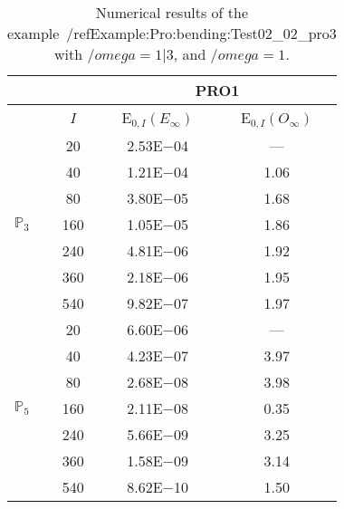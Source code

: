 \begin{table}[H]
\caption{Numerical results of the example~/ref{Example:Pro:bending:Test02_02_pro3} with $/omega=1|3$, and $/omega=1$.}
\setlength{\tabcolsep}{5pt}
\centering
\begin{tabular}{@{}l c c c@{}}
\toprule
 &  & \multicolumn{2}{c}{PRO1}\\
\midrule
 & $I$ & E$_{0,I}(E_{\infty})$ & E$_{0,I}(O_{\infty})$\\
\midrule
\multirow{7}{*}{$\mathbb{P}_{3}$}
 & 20 & 2.53E$-$04 & ---\\
 & 40 & 1.21E$-$04 & 1.06\\
 & 80 & 3.80E$-$05 & 1.68\\
 & 160 & 1.05E$-$05 & 1.86\\
 & 240 & 4.81E$-$06 & 1.92\\
 & 360 & 2.18E$-$06 & 1.95\\
 & 540 & 9.82E$-$07 & 1.97\\
\midrule
\multirow{7}{*}{$\mathbb{P}_{5}$}
 & 20 & 6.60E$-$06 & ---\\
 & 40 & 4.23E$-$07 & 3.97\\
 & 80 & 2.68E$-$08 & 3.98\\
 & 160 & 2.11E$-$08 & 0.35\\
 & 240 & 5.66E$-$09 & 3.25\\
 & 360 & 1.58E$-$09 & 3.14\\
 & 540 & 8.62E$-$10 & 1.50\\
\bottomrule
\end{tabular}
\label{Table:PRO:test_02_02_test6_pro3}
\end{table}
